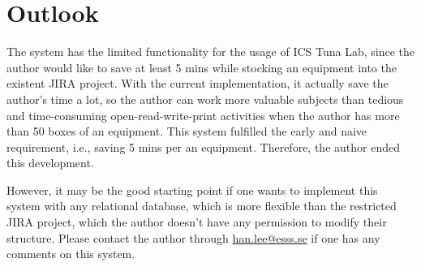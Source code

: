 \documentclass[11pt
  , a4paper
  , article
  , oneside
  , showtrims
]{memoir}
\begin{document}
\chapter{Outlook}

The system has the limited functionality for the usage of ICS Tuna Lab, since the author would like to save at least 5 mins while stocking an equipment into the existent JIRA project. With the current implementation, it actually save the author's time a lot, so the author can work more valuable subjects than tedious and time-consuming open-read-write-print activities when the author has more than 50 boxes of an equipment. This system fulfilled the early and naive requirement, i.e., saving 5 mins per an equipment. Therefore, the author ended this development. 

However, it may be the good starting point if one wants to implement this system with any relational database, which is more flexible than the restricted JIRA project, which the author doesn't have any permission to modify their structure. Please contact the author through \href{mailto:han.lee@esss.se}{han.lee@esss.se} if one has any comments on this system. 
\end{document}
